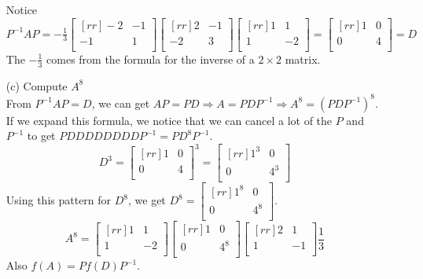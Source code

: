 \documentclass{report}
\theoremstyle{plain}
\theoremstyle{definition}
\theoremstyle{plain}
\begin{document}
\begin{enumerate}
Notice $P^{-1}AP = -\frac{1}{3}\begin{bmatrix}[rr]-2&-1\\-1&1\\\end{bmatrix}\begin{bmatrix}[rr]2&-1\\-2&3\\\end{bmatrix}\begin{bmatrix}[rr]1&1\\1&-2\\\end{bmatrix}=\begin{bmatrix}[rr]1&0\\0&4\\\end{bmatrix}=D$\\
The $-\frac{1}{3}$ comes from the formula for the inverse of a $2\times 2$ matrix.
\item[(c)]Compute $A^8$\\
From $P^{-1}AP=D$, we can get $AP=PD \Rightarrow A=PDP^{-1} \Rightarrow A^8 = (PDP^{-1})^8$. If we expand this formula, we notice that we can cancel a lot of the $P$ and $P^{-1}$ to get $PDDDDDDDDP^{-1} = PD^8P^{-1}$.
\[ D^3 = \begin{bmatrix}[rr]1&0\\0&4\\\end{bmatrix}^3 = \begin{bmatrix}[rr]1^3&0\\0&4^3\\\end{bmatrix} \]
Using this pattern for $D^8$, we get $D^8=\begin{bmatrix}[rr]1^8&0\\0&4^8\\\end{bmatrix}$.
\[ A^8 =\begin{bmatrix}[rr]1&1\\1&-2\\\end{bmatrix}\begin{bmatrix}[rr]1&0\\0&4^8\\\end{bmatrix}\begin{bmatrix}[rr]2&1\\1&-1\\\end{bmatrix}\frac{1}{3} \]
Also $f(A)=Pf(D)P^{-1}$.
\end{enumerate}
\end{document}
